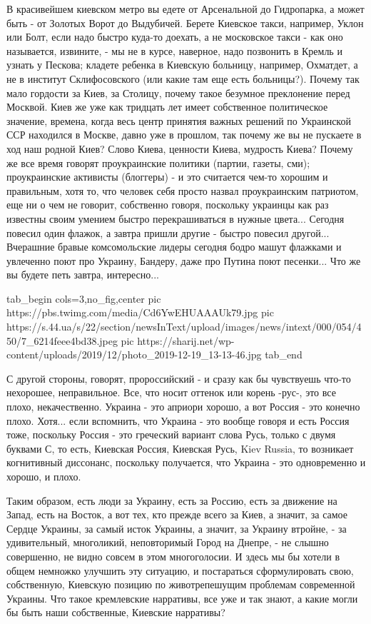 В красивейшем киевском метро вы
едете от Арсенальной до Гидропарка, а может быть - от Золотых Ворот до
Выдубичей. Берете Киевское такси, например, Уклон или Болт, если надо быстро
куда-то доехать, а не московское такси - как оно называется, извините, - мы не
в курсе, наверное, надо позвонить в Кремль и узнать у Пескова; кладете ребенка
в Киевскую больницу, например, Охматдет, а не в институт Склифосовского (или
какие там еще есть больницы?). Почему так мало гордости за Киев, за Столицу,
почему такое безумное преклонение перед Москвой.  Киев же уже как тридцать лет
имеет собственное политическое значение, времена, когда весь центр принятия
важных решений по Украинской ССР находился в Москве, давно уже в прошлом, так
почему же вы не пускаете в ход наш родной Киев? Слово Киева, ценности Киева,
мудрость Киева? Почему же все время говорят проукраинские политики (партии,
газеты, сми); проукраинские активисты (блоггеры) - и это считается чем-то
хорошим и правильным, хотя то, что человек себя просто назвал проукраинским
патриотом, еще ни о чем не говорит, собственно говоря, поскольку украинцы как
раз известны своим умением быстро перекрашиваться в нужные цвета... Сегодня
повесил один флажок, а завтра пришли другие - быстро повесил другой...
Вчерашние бравые комсомольские лидеры сегодня бодро машут флажками и увлеченно
поют про Украину, Бандеру, даже про Путина поют песенки... Что же вы будете петь завтра, интересно... 

\ifcmt
  tab_begin cols=3,no_fig,center
     pic https://pbs.twimg.com/media/Cd6YwEHUAAAUk79.jpg
		 pic https://s.44.ua/s/22/section/newsInText/upload/images/news/intext/000/054/450/7_6214feee4bd38.jpeg
		 pic https://sharij.net/wp-content/uploads/2019/12/photo_2019-12-19_13-13-46.jpg
  tab_end
\fi

С другой
стороны, говорят, пророссийский - и сразу как бы чувствуешь что-то нехорошее,
неправильное. Все, что носит оттенок или корень -рус-, это все плохо,
некачественно.  Украина - это априори хорошо, а вот Россия - это конечно плохо.
Хотя... если вспомнить, что Украина - это вообще говоря и есть Россия тоже,
поскольку Россия - это греческий вариант слова Русь, только с двумя буквами С,
то есть, Киевская Россия, Киевская Русь, Kiev Russia, то возникает когнитивный
диссонанс, поскольку получается, что Украина - это одновременно и хорошо, и
плохо. 

Таким образом, есть люди за Украину, есть за Россию, есть за движение на Запад,
есть на Восток, а вот тех, кто прежде всего за Киев, а значит, за самое Сердце
Украины, за самый исток Украины, а значит, за Украину втройне, - за
удивительный, многоликий, неповторимый Город на Днепре, - не слышно совершенно,
не видно совсем в этом многоголосии. И здесь мы бы хотели в общем немножко
улучшить эту ситуацию, и постараться сформулировать свою, собственную, Киевскую
позицию по животрепешущим проблемам современной Украины. Что такое кремлевские
нарративы, все уже и так знают, а какие могли бы быть наши собственные,
Киевские нарративы?

